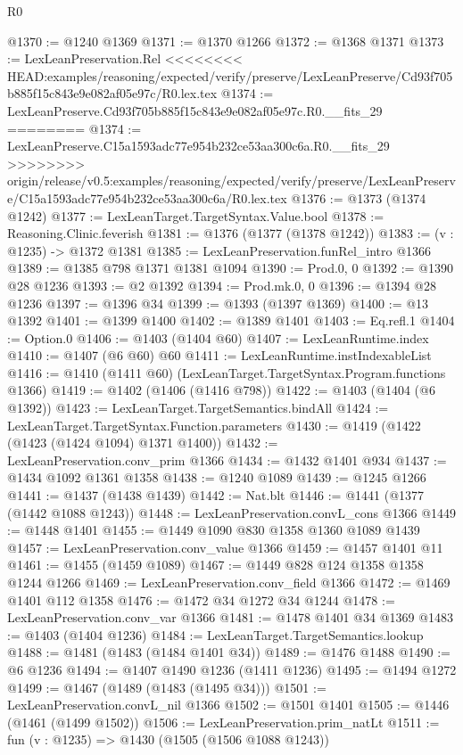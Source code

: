 \begin{lexlean}{R0}
\begin{coremodule}
{{{{{{{{{{{{{{{{{{{{{{{{{{{{{{{{{{{{{{{{{{{{{{{{{{{{{{{{{{{{{{{{{{{{{{{{{{{{{{{{{{{{{{@1370 := @1240 @1369
@1371 := @1370 @1266
@1372 := @1368 @1371
@1373 := LexLeanPreservation.Rel
<<<<<<<< HEAD:examples/reasoning/expected/verify/preserve/LexLeanPreserve/Cd93f705b885f15c843e9e082af05e97c/R0.lex.tex
@1374 := LexLeanPreserve.Cd93f705b885f15c843e9e082af05e97c.R0.__fits_29
========
@1374 := LexLeanPreserve.C15a1593adc77e954b232ce53aa300c6a.R0.__fits_29
>>>>>>>> origin/release/v0.5:examples/reasoning/expected/verify/preserve/LexLeanPreserve/C15a1593adc77e954b232ce53aa300c6a/R0.lex.tex
@1376 := @1373 (@1374 @1242)
@1377 := LexLeanTarget.TargetSyntax.Value.bool
@1378 := Reasoning.Clinic.feverish
@1381 := @1376 (@1377 (@1378 @1242))
@1383 := (v : @1235) -> @1372 @1381
@1385 := LexLeanPreservation.funRel_intro @1366
@1389 := @1385 @798 @1371 @1381 @1094
@1390 := Prod.{0, 0}
@1392 := @1390 @28 @1236
@1393 := @2 @1392
@1394 := Prod.mk.{0, 0}
@1396 := @1394 @28 @1236
@1397 := @1396 @34
@1399 := @1393 (@1397 @1369)
@1400 := @13 @1392
@1401 := @1399 @1400
@1402 := @1389 @1401
@1403 := Eq.refl.{1}
@1404 := Option.{0}
@1406 := @1403 (@1404 @60)
@1407 := LexLeanRuntime.index
@1410 := @1407 (@6 @60) @60
@1411 := LexLeanRuntime.instIndexableList
@1416 := @1410 (@1411 @60) (LexLeanTarget.TargetSyntax.Program.functions @1366)
@1419 := @1402 (@1406 (@1416 @798))
@1422 := @1403 (@1404 (@6 @1392))
@1423 := LexLeanTarget.TargetSemantics.bindAll
@1424 := LexLeanTarget.TargetSyntax.Function.parameters
@1430 := @1419 (@1422 (@1423 (@1424 @1094) @1371 @1400))
@1432 := LexLeanPreservation.conv_prim @1366
@1434 := @1432 @1401 @934
@1437 := @1434 @1092 @1361 @1358
@1438 := @1240 @1089
@1439 := @1245 @1266
@1441 := @1437 (@1438 @1439)
@1442 := Nat.blt
@1446 := @1441 (@1377 (@1442 @1088 @1243))
@1448 := LexLeanPreservation.convL_cons @1366
@1449 := @1448 @1401
@1455 := @1449 @1090 @830 @1358 @1360 @1089 @1439
@1457 := LexLeanPreservation.conv_value @1366
@1459 := @1457 @1401 @11
@1461 := @1455 (@1459 @1089)
@1467 := @1449 @828 @124 @1358 @1358 @1244 @1266
@1469 := LexLeanPreservation.conv_field @1366
@1472 := @1469 @1401 @112 @1358
@1476 := @1472 @34 @1272 @34 @1244
@1478 := LexLeanPreservation.conv_var @1366
@1481 := @1478 @1401 @34 @1369
@1483 := @1403 (@1404 @1236)
@1484 := LexLeanTarget.TargetSemantics.lookup
@1488 := @1481 (@1483 (@1484 @1401 @34))
@1489 := @1476 @1488
@1490 := @6 @1236
@1494 := @1407 @1490 @1236 (@1411 @1236)
@1495 := @1494 @1272
@1499 := @1467 (@1489 (@1483 (@1495 @34)))
@1501 := LexLeanPreservation.convL_nil @1366
@1502 := @1501 @1401
@1505 := @1446 (@1461 (@1499 @1502))
@1506 := LexLeanPreservation.prim_natLt
@1511 := fun (v : @1235) => @1430 (@1505 (@1506 @1088 @1243))
}}}}}}}}}}}}}}}}}}}}}}}}}}}}}}}}}}}}}}}}}}}}}}}}}}}}}}}}}}}}}}}}}}}}}}}}}}}}}}}}}}}}}}
\end{coremodule}
\end{lexlean}
